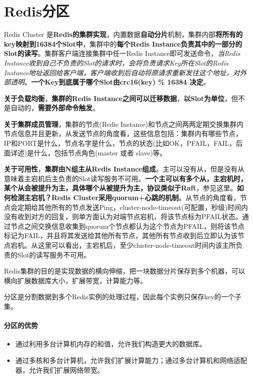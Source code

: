 \documentclass[UTF8,a4paper,12pt]{ctexbook}
\begin{document}
		
	\section{Redis分区}
		Redis Cluster 是\textbf{Redis的集群实现}，内置数据\textbf{自动分片}机制，集群内部\textbf{将所有的key映射到16384个Slot中}，集群中的\textbf{每个Redis Instance负责其中的一部分的Slot的读写}。集群客户端连接集群中任一Redis Instance即可发送命令，\textit{当Redis Instance收到自己不负责的Slot的请求时，会将负责请求Key所在Slot的Redis Instance地址返回给客户端，客户端收到后自动将原请求重新发往这个地址，对外部透明}。\textbf{一个Key到底属于哪个Slot由crc16(key) \% 16384 决定}。
				
		 \textbf{关于负载均衡}，\textbf{集群的Redis Instance之间可以迁移数据}，\textbf{以Slot为单位}，但不是自动的，\textbf{需要外部命令触发}。
			
		 \textbf{关于集群成员管理}，集群的节点(Redis Instance)和节点之间两两定期交换集群内节点信息并且更新，从发送节点的角度看，这些信息包括：集群内有哪些节点，IP和PORT是什么，节点名字是什么，节点的状态(比如OK，PFAIL，FAIL，后面详述)是什么，包括节点角色(master 或者 slave)等。
			
		 \textbf{关于可用性}，\textbf{集群由N组主从Redis Instance组成}。主可以没有从，但是没有从 意味着主宕机后主负责的Slot读写服务不可用。\textbf{一个主可以有多个从，主宕机时，某个从会被提升为主，具体哪个从被提升为主，协议类似于Raft}，参见这里。\textbf{如何检测主宕机？Redis Cluster采用quorum+心跳的机制}。从节点的角度看，节点会定期给其他所有的节点发送Ping，cluster-node-timeout(可配置，秒级)时间内没有收到对方的回复，则单方面认为对端节点宕机，将该节点标为PFAIL状态。通过节点之间交换信息收集到quorum个节点都认为这个节点为PFAIL，则将该节点标记为FAIL，并且将其发送给其他所有节点，其他所有节点收到后立即认为该节点宕机。从这里可以看出，主宕机后，至少cluster-node-timeout时间内该主所负责的Slot的读写服务不可用。
				 
		Redis集群的目的是实现数据的横向伸缩，把一块数据分片保存到多个机器，可以横向扩展数据库大小，扩展带宽，计算能力等。 
		
		分区是分割数据到多个Redis实例的处理过程，因此每个实例只保存key的一个子集。

		\paragraph{分区的优势}
			\begin{itemize}
				\item 通过利用多台计算机内存的和值，允许我们构造更大的数据库。
				\item 通过多核和多台计算机，允许我们扩展计算能力；通过多台计算机和网络适配器，允许我们扩展网络带宽。
			\end{itemize}
		
\end{document}
